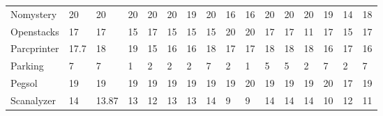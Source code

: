 \begin{table}[htb]
\begin{tabular}{llllllllllllllll}
Nomystery                & 20                                 & 20              & 20              & 20              & 20              & 19                              & 20                    & 16                   & 16                   & 20                     & 20                     & 20                              & 19                    & 14                      & 18                      \\
Openstacks               & 17                                 & 17              & 15              & 17              & 15              & 15                              & 15                    & 20                   & 20                   & 17                     & 17                     & 11                              & 17                    & 15                      & 17                      \\
Parcprinter              & 17.7                               & 18              & 19              & 15              & 16              & 16                              & 18                    & 17                   & 17                   & 18                     & 18                     & 18                              & 16                    & 17                      & 16                      \\
Parking                  & 7                                  & 7               & 1               & 2               & 2               & 2                               & 7                     & 2                    & 1                    & 5                      & 5                      & 2                               & 7                     & 2                       & 7                       \\
Pegsol                   & 19                                 & 19              & 19              & 19              & 19              & 19                              & 19                    & 19                   & 20                   & 19                     & 19                     & 19                              & 20                    & 17                      & 19                      \\
Scanalyzer               & 14                                 & 13.87           & 13              & 12              & 13              & 13                              & 14                    & 9                    & 9                    & 14                     & 14                     & 14                              & 10                    & 12                      & 11                      \\

\end{tabular}
\end{table}
